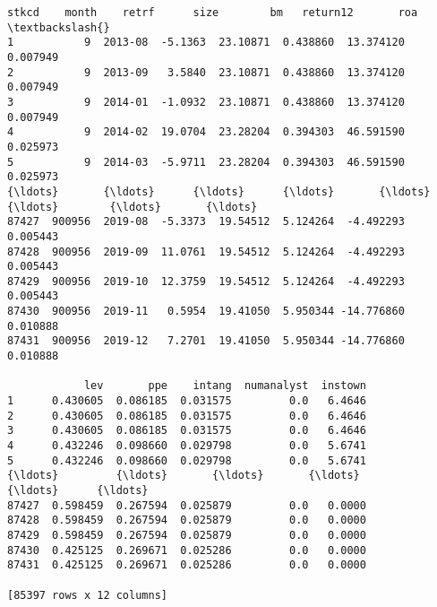 \documentclass[11pt]{article}
\makeatletter
\newcommand{\boxspacing}{\kern\kvtcb@left@rule\kern\kvtcb@boxsep}
\newcommand{\prompt}[4]{
        {\ttfamily\llap{{\color{#2}[#3]:\hspace{3pt}#4}}\vspace{-\baselineskip}}
    }
\makeatother
\begin{document}
            \begin{tcolorbox}[breakable, size=fbox, boxrule=.5pt, pad at break*=1mm, opacityfill=0]
\prompt{Out}{outcolor}{8}{\boxspacing}
\begin{Verbatim}[commandchars=\\\{\}]
        stkcd    month    retrf      size        bm   return12       roa  \textbackslash{}
1           9  2013-08  -5.1363  23.10871  0.438860  13.374120  0.007949
2           9  2013-09   3.5840  23.10871  0.438860  13.374120  0.007949
3           9  2014-01  -1.0932  23.10871  0.438860  13.374120  0.007949
4           9  2014-02  19.0704  23.28204  0.394303  46.591590  0.025973
5           9  2014-03  -5.9711  23.28204  0.394303  46.591590  0.025973
{\ldots}       {\ldots}      {\ldots}      {\ldots}       {\ldots}       {\ldots}        {\ldots}       {\ldots}
87427  900956  2019-08  -5.3373  19.54512  5.124264  -4.492293  0.005443
87428  900956  2019-09  11.0761  19.54512  5.124264  -4.492293  0.005443
87429  900956  2019-10  12.3759  19.54512  5.124264  -4.492293  0.005443
87430  900956  2019-11   0.5954  19.41050  5.950344 -14.776860  0.010888
87431  900956  2019-12   7.2701  19.41050  5.950344 -14.776860  0.010888

            lev       ppe    intang  numanalyst  instown
1      0.430605  0.086185  0.031575         0.0   6.4646
2      0.430605  0.086185  0.031575         0.0   6.4646
3      0.430605  0.086185  0.031575         0.0   6.4646
4      0.432246  0.098660  0.029798         0.0   5.6741
5      0.432246  0.098660  0.029798         0.0   5.6741
{\ldots}         {\ldots}       {\ldots}       {\ldots}         {\ldots}      {\ldots}
87427  0.598459  0.267594  0.025879         0.0   0.0000
87428  0.598459  0.267594  0.025879         0.0   0.0000
87429  0.598459  0.267594  0.025879         0.0   0.0000
87430  0.425125  0.269671  0.025286         0.0   0.0000
87431  0.425125  0.269671  0.025286         0.0   0.0000

[85397 rows x 12 columns]
\end{Verbatim}
\end{tcolorbox}
        
\end{document}
